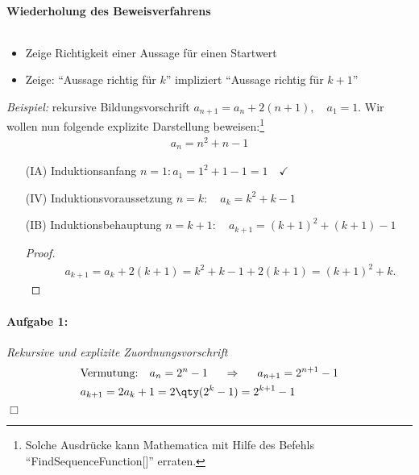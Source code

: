 
\paragraph{Wiederholung des Beweisverfahrens}$~$

\begin{itemize}
    \item Zeige Richtigkeit einer Aussage für einen Startwert 
    \item Zeige: ``Aussage richtig für $k$'' impliziert ``Aussage richtig für $k+1$''
\end{itemize}

\emph{Beispiel:} rekursive Bildungsvorschrift $a_{n+1} = a_n + 2(n+1), \quad a_1 = 1$. Wir wollen nun folgende explizite Darstellung beweisen:\footnote{Solche Ausdrücke kann Mathematica mit Hilfe des Befehls ``FindSequenceFunction[]'' erraten.} 
\begin{align}
    a_n = n^2 + n-1
\end{align}
\begin{enumerate}
    \item[(IA)] Induktionsanfang $n=1: a_1 = 1^2 +1 - 1 = 1 \quad\checkmark$ 
    \item[(IV)] Induktionsvoraussetzung $n=k: \quad a_k = k^2 + k -1 $
    \item[(IB)] Induktionsbehauptung $n=k+1: \quad a_{k+1}= (k+1)^2 + (k+1) - 1$
    \begin{proof}$~$\\[-1.5cm]
        \begin{align}
            \qquad a_{k+1} = a_k + 2(k+1) = k^2 +k-1 + 2(k+1) = (k+1)^2 + k.
        \end{align}
    \end{proof}
\end{enumerate}

\paragraph{Aufgabe 1: } \emph{Rekursive und explizite Zuordnungsvorschrift}
\begin{align}
    &\text{Vermutung: }\hspace{0.2cm} a_n=2^n-1 \hspace{0.5cm} \Rightarrow \hspace{0.5cm} a_{n+1}=2^{n+1}-1 \\
    &a_{k+1}=2a_k+1=2\qty(2^k-1)=2^{k+1}-1
\end{align}\hfill $\Box$
%
